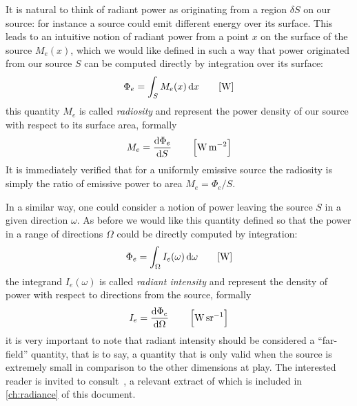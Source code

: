It is natural to think of radiant power as originating from a region $\delta S$ on our source:
for instance a source could emit different energy over its surface. This leads to an
intuitive notion of radiant power from a point $x$ on the surface of the source
$M_e(x)$, which
we would like defined in such a way that power originated from our source $S$
can be computed
directly by integration over its surface:
\begin{displaymath}
\Phi_e = \int_{S} M_e(x) \d x \qquad [\unit{\watt}]
\end{displaymath}
this quantity $M_e$ is called \textsl{radiosity} and represent the power density
of our
source with respect to its surface area, formally
\begin{displaymath}
M_e = \frac{\d\Phi_e}{\d S} \qquad \left[\unit{\watt\per\square\meter}\right]
\end{displaymath}
It is immediately verified that for a uniformly emissive source the
radiosity is simply the ratio of emissive power to area
$M_e = \Phi_e / S$.

In a similar way, one could consider a notion of power leaving the source $S$ in
a given
direction $\omega$.
As before we would like this quantity defined so that the power in a range of
directions
$\Omega$ could be directly computed by integration:
\begin{displaymath}
\Phi_e = \int_\Omega I_e(\omega) \d\omega \qquad [\unit{\watt}]
\end{displaymath}
the integrand $I_e(\omega)$ is called \textsl{radiant intensity} and represent
the density
of power with respect to directions from the source, formally
\begin{displaymath}
I_e = \frac{\d\Phi_e}{\d\Omega} \qquad \left[\unit{\watt\per\steradian}\right]
\end{displaymath}
it is very important to note that radiant intensity should be considered a
``far-field'' quantity, that is to say, a quantity that is only valid when
the source is extremely small in comparison to the other dimensions at play.
The interested reader is invited to consult~\cite{nicodemus63}, a relevant
extract of which is included in \cref{ch:radiance} of this document.


